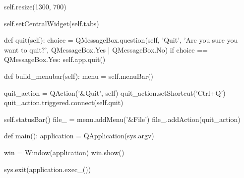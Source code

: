 \begin{pythoncode}
        self.resize(1300, 700)

        self.setCentralWidget(self.tabs)

    def quit(self):
        choice = QMessageBox.question(self, 'Quit', 'Are you sure you want to quit?',
                                      QMessageBox.Yes | QMessageBox.No)
        if choice == QMessageBox.Yes:
            self.app.quit()

    def build_menubar(self):
        menu = self.menuBar()

        quit_action = QAction('&Quit', self)
        quit_action.setShortcut('Ctrl+Q')
        quit_action.triggered.connect(self.quit)

        self.statusBar()
        file_ = menu.addMenu('&File')
        file_.addAction(quit_action)


def main():
    application = QApplication(sys.argv)

    win = Window(application)
    win.show()

    sys.exit(application.exec_())
\end{pythoncode}
